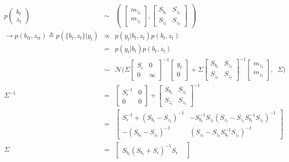 \documentclass[9pt]{article}
\newcommand{\N}{\mathcal{N}}
\newcommand{\m}[1]{m_{#1}}                  %
\newcommand{\s}[1]{S_{#1}}                  %
\newcommand{\Sn}{\s{\epsilon}}              %
\newcommand{\now}[1]{#1_t}                  %
\newcommand{\pno}[1]{#1_{t}}  %
\newcommand{\uno}[1]{#1_{tt}}              %
\newcommand{\inv}{^{-1}}
\newcommand{\nnn}{\nonumber \\}
\begin{document}
\begin{eqnarray}
 p\begin{pmatrix} \pno{b} \\ \pno{z} \end{pmatrix} &\sim&
 \begin{pmatrix} \begin{bmatrix} \m{\pno{z}} \\ \m{\pno{z}} \end{bmatrix}, \begin{bmatrix} \s{\pno{b}} & \s{\pno{z}} \\ \s{\pno{z}} & \s{\pno{z}} \end{bmatrix} \end{pmatrix} \nnn
 \rightarrow p(\uno{b},\uno{z}) \triangleq p(\{\pno{b},\pno{z}\}|\now{y})
   &\propto& p(\now{y}|\pno{b},\pno{z})p(\pno{b},\pno{z}) \nnn
   &=& p(\now{y}|\pno{b})p(\pno{b},\pno{z}) \nnn
   &\sim& \N \Big(\Sigma \begin{bmatrix} \Sn & 0 \\ 0 & \infty \end{bmatrix}\inv \begin{bmatrix} \now{y} \\ 0 \end{bmatrix} + \Sigma \begin{bmatrix} \s{\pno{b}} & \s{\pno{z}} \\ \s{\pno{z}} & \s{\pno{z}} \end{bmatrix}\inv \begin{bmatrix} \m{\pno{z}} \\ \m{\pno{z}} \end{bmatrix}, \;\; \Sigma \Big) \nnn
 \Sigma\inv
   &=& \begin{bmatrix} \Sn\inv & 0 \\ 0 & 0 \end{bmatrix}
      +\begin{bmatrix} \s{\pno{b}} & \s{\pno{z}} \\ \s{\pno{z}} & \s{\pno{z}} \end{bmatrix}\inv \nnn
   &=& \begin{bmatrix} \Sn\inv+(\s{\pno{b}}-\s{\pno{z}})\inv &
   -\s{\pno{b}}\inv \s{\pno{z}} (\s{\pno{z}}-\s{\pno{z}} \s{\pno{b}}\inv \s{\pno{z}})\inv \\
   -(\s{\pno{b}}-\s{\pno{z}})\inv &
   (\s{\pno{z}}-\s{\pno{z}} \s{\pno{b}}\inv \s{\pno{z}})\inv \end{bmatrix} \nnn
 \Sigma
   &=& \begin{bmatrix} \s{\pno{b}} (\s{\pno{b}} + \Sn)\inv \Sn &

\end{bmatrix}
\end{eqnarray}
\end{document}
